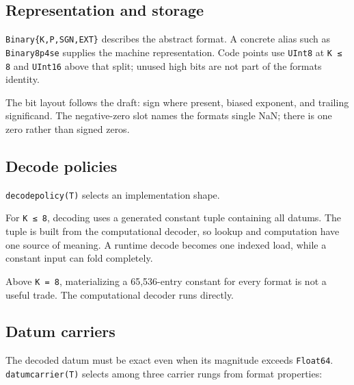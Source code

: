 \subsection{Representation and storage}



\label{7731229487896645651}{}


\texttt{Binary\{K,P,SGN,EXT\}} describes the abstract format. A concrete alias such as \texttt{Binary8p4se} supplies the machine representation. Code points use \texttt{UInt8} at \texttt{K ≤ 8} and \texttt{UInt16} above that split; unused high bits are not part of the format{\textquotesingle}s identity.



The bit layout follows the draft: sign where present, biased exponent, and trailing significand. The negative-zero slot names the format{\textquotesingle}s single NaN; there is one zero rather than signed zeros.



\subsection{Decode policies}



\label{3643301036121596314}{}


\texttt{decodepolicy(T)} selects an implementation shape.



For \texttt{K ≤ 8}, decoding uses a generated constant tuple containing all datums. The tuple is built from the computational decoder, so lookup and computation have one source of meaning. A runtime decode becomes one indexed load, while a constant input can fold completely.



Above \texttt{K = 8}, materializing a 65,536-entry constant for every format is not a useful trade. The computational decoder runs directly.



\subsection{Datum carriers}



\label{3796321559742241881}{}


The decoded datum must be exact even when its magnitude exceeds \texttt{Float64}. \texttt{datumcarrier(T)} selects among three carrier rungs from format properties:



